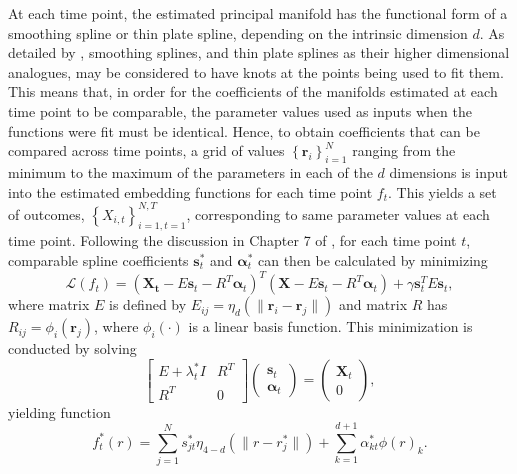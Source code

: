 \documentclass[11pt,reqno]{article}
\theoremstyle{definition}
\begin{document}
At each time point, the estimated principal manifold has the functional form of a smoothing spline or thin plate spline, depending on the intrinsic dimension $d$. As detailed by \cite{greenSilverman1994}, smoothing splines, and thin plate splines as their higher dimensional analogues, may be considered to have knots at the points being used to fit them. This means that, in order for the coefficients of the manifolds estimated at each time point to be comparable, the parameter values used as inputs when the functions were fit must be identical. Hence, to obtain coefficients that can be compared across time points, a grid of values $\left\{\mathbf{r}_i\right\}_{i=1}^{N}$ ranging from the minimum to the maximum of the parameters in each of the $d$ dimensions is input into the estimated embedding functions for each time point $f_t$. This yields a set of outcomes, $\left\{X_{i,t}\right\}_{i=1, t = 1}^{N, T}$, corresponding to same parameter values at each time point. Following the discussion in Chapter 7 of \cite{greenSilverman1994}, for each time point $t$, comparable spline coefficients $\mathbf{s}_t^*$ and $\mathbf{\alpha}_t^*$ can then be calculated by minimizing
\[%
  \mathcal{L}(f_t) = (\mathbf{X_t} - E\mathbf{s}_t - R^{T}\mathbf{\alpha}_t)^{T}(\mathbf{X} - E\mathbf{s}_t - R^{T}\mathbf{\alpha}_t) + \gamma\mathbf{s}_t^{T}E\mathbf{s}_t
,\]%
where matrix $E$ is defined by $E_{ij} = \eta_{d}(\|\mathbf{r}_i - \mathbf{r}_j\|)$ and matrix $R$ has $R_{ij} = \phi_i(\mathbf{r}_j)$, where $\phi_i(\cdot)$ is a linear basis function. This minimization is conducted by solving
\[%
  \left[
    \begin{array}{cc}
      E + \lambda_t^* I & R^{T} \\
      R^{T} & 0
    \end{array}
  \right]\left(
    \begin{array}{c}
      \mathbf{s}_t \\
      \mathbf{\alpha}_t
    \end{array}
  \right) = \left(
    \begin{array}{c}
      \mathbf{X}_t \\
      0
    \end{array}
  \right)
,\]%
yielding function
\[%
  f_t^*(r) = \sum_{j=1}^{N}s_{jt}^* \eta_{4-d}\left(\|r - r_j^*\|\right) + \sum_{k=1}^{d + 1}\alpha_{kt}^*\phi(r)_k
.\]%
\end{document}
